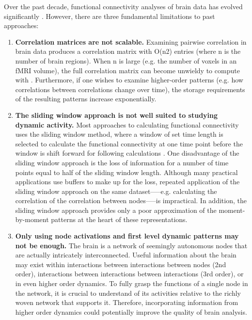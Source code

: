 \documentclass[12pt]{article}
\begin{document}
Over the past decade, functional connectivity analyses of brain data has evolved significantly \cite{olaf2005}\cite{khambhati2017}. However, there are three fundamental limitations to past approaches:\\
\begin{enumerate}
\item	\textbf{Correlation matrices are not scalable.} Examining pairwise correlation in brain data
produces a correlation matrix with O(n2) entries (where n is the number of brain regions). When n is large (e.g. the number of voxels in an fMRI volume), the full correlation matrix can become unwieldy to compute with \cite{Rubinov2010}\cite{Betzel2017}\cite{Craddock2012}\cite{Yeo2011}. Furthermore, if one wishes to examine higher-order patterns (e.g. how correlations between correlations change over time), the storage requirements of the resulting patterns increase exponentially.

\item \textbf{The sliding window approach is not well suited to studying dynamic activity.} Most approaches to calculating functional connectivity uses the sliding window method, where a window of set time length is selected to calculate the functional connectivity at one time point before the window is shift forward for following calculations \cite{enrico2011}\cite{elena2012}. One disadvantage of the sliding window approach is the loss of information for a number of time points equal to half of the sliding window length. Although many practical applications use buffers to make up for the loss, repeated application of the sliding window approach on the same dataset—--e.g. calculating the correlation of the correlation between nodes—--is impractical. In addition, the sliding window approach provides only a poor approximation of the moment-by-moment patterns at the heart of these representations.\\

\item \textbf{Only using node activations and first level dynamic patterns may not be enough.} The brain is a network of seemingly autonomous nodes that are actually intricately interconnected. Useful information about the brain may exist within interactions between interactions between nodes (2nd order), interactions between interactions between interactions (3rd order), or in even higher order dynamics. To fully grasp the functions of a single node in the network, it is crucial to understand of its activities relative to the richly woven network that supports it. Therefore, incorporating information from higher order dynamics could potentially improve the quality of brain analysis.

\end{enumerate}
\end{document}
